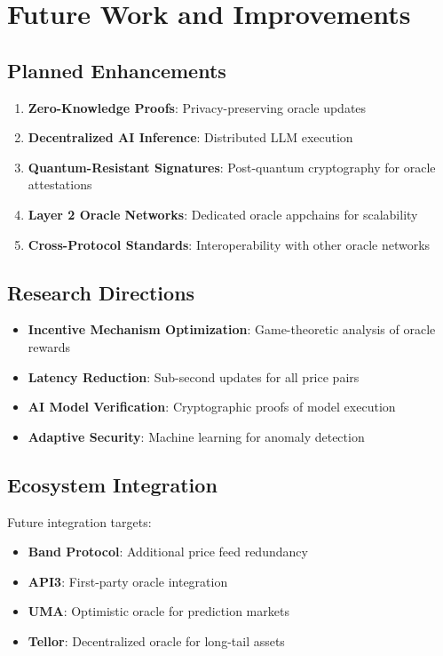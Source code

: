 \section{Future Work and Improvements}


\subsection{Planned Enhancements}

\begin{enumerate}
    \item \textbf{Zero-Knowledge Proofs}: Privacy-preserving oracle updates
    \item \textbf{Decentralized AI Inference}: Distributed LLM execution
    \item \textbf{Quantum-Resistant Signatures}: Post-quantum cryptography for oracle attestations
    \item \textbf{Layer 2 Oracle Networks}: Dedicated oracle appchains for scalability
    \item \textbf{Cross-Protocol Standards}: Interoperability with other oracle networks
\end{enumerate}

\subsection{Research Directions}

\begin{itemize}
    \item \textbf{Incentive Mechanism Optimization}: Game-theoretic analysis of oracle rewards
    \item \textbf{Latency Reduction}: Sub-second updates for all price pairs
    \item \textbf{AI Model Verification}: Cryptographic proofs of model execution
    \item \textbf{Adaptive Security}: Machine learning for anomaly detection
\end{itemize}

\subsection{Ecosystem Integration}

Future integration targets:

\begin{itemize}
    \item \textbf{Band Protocol}: Additional price feed redundancy
    \item \textbf{API3}: First-party oracle integration
    \item \textbf{UMA}: Optimistic oracle for prediction markets
    \item \textbf{Tellor}: Decentralized oracle for long-tail assets
\end{itemize}

